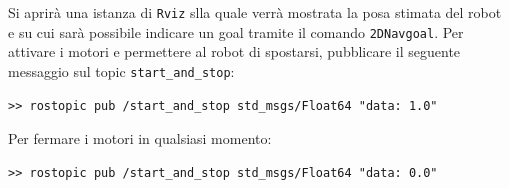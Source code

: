 Si aprirà una istanza di \verb!Rviz! slla quale verrà mostrata la posa stimata del robot e su cui sarà possibile indicare un goal tramite il comando \verb!2DNavgoal!.
Per attivare i motori e permettere al robot di spostarsi, pubblicare il seguente messaggio sul topic \verb!start_and_stop!:

\medskip
\begin{tcolorbox}
\begin{verbatim}
>> rostopic pub /start_and_stop std_msgs/Float64 "data: 1.0"
\end{verbatim}
\end{tcolorbox}

Per fermare i motori in qualsiasi momento:

\medskip
\begin{tcolorbox}
\begin{verbatim}
>> rostopic pub /start_and_stop std_msgs/Float64 "data: 0.0"
\end{verbatim}
\end{tcolorbox}